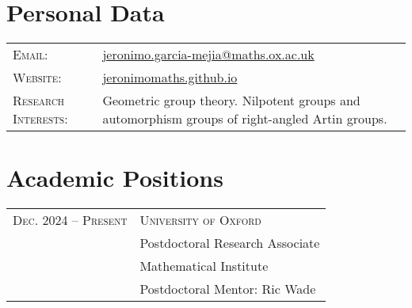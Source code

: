 \documentclass[a4paper,11pt]{article} %
\begin{document}
\pagestyle{empty} %


\par{\bigskip\par} %

\section{Personal Data}

\begin{longtable}{>{\raggedleft\arraybackslash}p{4cm}p{10cm}}
\textsc{Email:} & \href{mailto:jeronimo.garcia-mejia@maths.ox.ac.uk}{jeronimo.garcia-mejia@maths.ox.ac.uk}\\
\textsc{Website:} & \href{https://jeronimomaths.github.io}{jeronimomaths.github.io} \\
\textsc{Research Interests:} & Geometric group theory. Nilpotent groups and automorphism groups of right-angled Artin groups. 
\end{longtable}

\section{Academic Positions}

\begin{longtable}{>{\raggedleft\arraybackslash}p{4cm}p{10cm}}
\textsc{Dec. 2024 -- Present} & \textsc{University of Oxford} \vspace{0.2em} \\
& Postdoctoral Research Associate \\
& Mathematical Institute \\
& \quad Postdoctoral Mentor: Ric Wade
\end{longtable}

\end{document}
